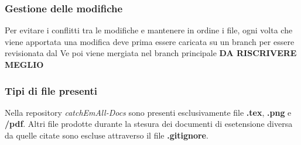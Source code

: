 \subsubsection{Gestione delle modifiche}
Per evitare i conflitti tra le modifiche e mantenere in ordine i file, ogni volta che viene apportata una modifica deve prima essere caricata su un branch per essere revisionata dal Ve poi viene mergiata nel branch principale \textbf{DA RISCRIVERE MEGLIO }

\subsubsection{Tipi di file presenti}
Nella repository \textit{catchEmAll-Docs} sono presenti esclusivamente file \textbf{.tex}, \textbf{.png} e \textbf{/pdf}. Altri file prodotte durante la stesura dei documenti di esetensione diversa da quelle citate sono escluse attraverso il file \textbf{.gitignore}.